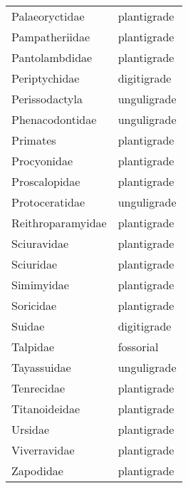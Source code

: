 \begin{table}[ht]
\begin{tabular}{ll}
  Palaeoryctidae & plantigrade \\ 
  Pampatheriidae & plantigrade \\ 
  Pantolambdidae & plantigrade \\ 
  Periptychidae & digitigrade \\ 
  Perissodactyla & unguligrade \\ 
  Phenacodontidae & unguligrade \\ 
  Primates & plantigrade \\ 
  Procyonidae & plantigrade \\ 
  Proscalopidae & plantigrade \\ 
  Protoceratidae & unguligrade \\ 
  Reithroparamyidae & plantigrade \\ 
  Sciuravidae & plantigrade \\ 
  Sciuridae & plantigrade \\ 
  Simimyidae & plantigrade \\ 
  Soricidae & plantigrade \\ 
  Suidae & digitigrade \\ 
  Talpidae & fossorial \\ 
  Tayassuidae & unguligrade \\ 
  Tenrecidae & plantigrade \\ 
  Titanoideidae & plantigrade \\ 
  Ursidae & plantigrade \\ 
  Viverravidae & plantigrade \\ 
  Zapodidae & plantigrade \\ 
   \hline
\end{tabular}
\end{table}
